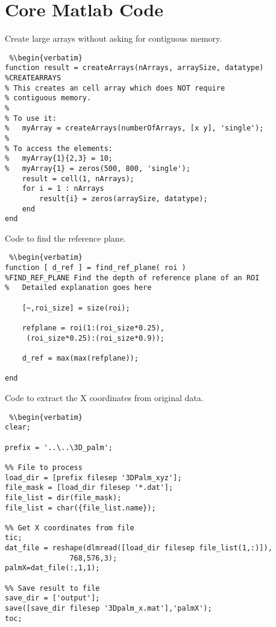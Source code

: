 \chapter{Core Matlab Code\label{ch:code}}



\singlespacing

Create large arrays without asking for contiguous memory.

\begin{lstlisting} %\begin{verbatim}
function result = createArrays(nArrays, arraySize, datatype)
%CREATEARRAYS
% This creates an cell array which does NOT require
% contiguous memory.
%
% To use it:
%   myArray = createArrays(numberOfArrays, [x y], 'single');
%
% To access the elements:
%   myArray{1}{2,3} = 10;
%   myArray{1} = zeros(500, 800, 'single');
    result = cell(1, nArrays);
    for i = 1 : nArrays
        result{i} = zeros(arraySize, datatype);
    end
end
\end{lstlisting} %


Code to find the reference plane.

\begin{lstlisting} %\begin{verbatim}
function [ d_ref ] = find_ref_plane( roi )
%FIND_REF_PLANE Find the depth of reference plane of an ROI
%   Detailed explanation goes here

	[~,roi_size] = size(roi);

	refplane = roi(1:(roi_size*0.25),
	 (roi_size*0.25):(roi_size*0.9));

	d_ref = max(max(refplane));

end
\end{lstlisting} %

\clearpage

Code to extract the X coordinates from original data.
\begin{lstlisting} %\begin{verbatim}
clear;

prefix = '..\..\3D_palm';

%% File to process
load_dir = [prefix filesep '3DPalm_xyz'];
file_mask = [load_dir filesep '*.dat'];
file_list = dir(file_mask);
file_list = char({file_list.name});

%% Get X coordinates from file
tic;
dat_file = reshape(dlmread([load_dir filesep file_list(1,:)]),
			   768,576,3);
palmX=dat_file(:,1,1);

%% Save result to file
save_dir = ['output'];
save([save_dir filesep '3Dpalm_x.mat'],'palmX');
toc;
\end{lstlisting} %


